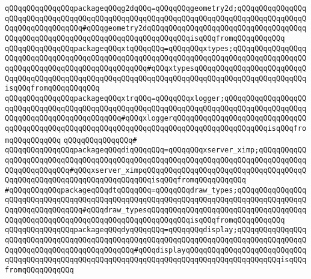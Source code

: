 \verb|qQQqqQQqqQQqqQQqpackageqQQqg2dqQQq=qQQqqQQqgeometry2d;qQQqqQQqqQQqqQQqqQQqqQQqqQQqqQQqqQQqqQQqqQQqqQQqqQQqqQQqqQQqqQQqqQQqqQQqqQQqqQQqqQQqqQQqqQQqqQQqqQQqqQQq#qQQqgeometry2dqQQqqQQqqQQqqQQqqQQqqQQqqQQqqQQqqQQqqQQqqQQqqQQqqQQqqQQqqQQqqQQqqQQqqQQqqQQqqQQqisqQQqfromqQQqqQQqqQQq|\newline
\verb|qQQqqQQqqQQqqQQqpackageqQQqxtqQQqqQQq=qQQqqQQqxtypes;qQQqqQQqqQQqqQQqqQQqqQQqqQQqqQQqqQQqqQQqqQQqqQQqqQQqqQQqqQQqqQQqqQQqqQQqqQQqqQQqqQQqqQQqqQQqqQQqqQQqqQQqqQQqqQQqqQQqqQQq#qQQqxtypesqQQqqQQqqQQqqQQqqQQqqQQqqQQqqQQqqQQqqQQqqQQqqQQqqQQqqQQqqQQqqQQqqQQqqQQqqQQqqQQqqQQqqQQqqQQqqQQqisqQQqfromqQQqqQQqqQQq|\newline
\verb|qQQqqQQqqQQqqQQqpackageqQQqxtrqQQq=qQQqqQQqxlogger;qQQqqQQqqQQqqQQqqQQqqQQqqQQqqQQqqQQqqQQqqQQqqQQqqQQqqQQqqQQqqQQqqQQqqQQqqQQqqQQqqQQqqQQqqQQqqQQqqQQqqQQqqQQqqQQqqQQq#qQQqxloggerqQQqqQQqqQQqqQQqqQQqqQQqqQQqqQQqqQQqqQQqqQQqqQQqqQQqqQQqqQQqqQQqqQQqqQQqqQQqqQQqqQQqqQQqqQQqisqQQqfromqQQqqQQqqQQq|\newline
\verb|qQQqqQQqqQQqqQQq#|\newline
\verb|qQQqqQQqqQQqqQQqpackageqQQqdiqQQqqQQq=qQQqqQQqxserver_ximp;qQQqqQQqqQQqqQQqqQQqqQQqqQQqqQQqqQQqqQQqqQQqqQQqqQQqqQQqqQQqqQQqqQQqqQQqqQQqqQQqqQQqqQQqqQQqqQQq#qQQqxserver_ximpqQQqqQQqqQQqqQQqqQQqqQQqqQQqqQQqqQQqqQQqqQQqqQQqqQQqqQQqqQQqqQQqqQQqqQQqisqQQqfromqQQqqQQqqQQq|\newline
\verb|#qQQqqQQqqQQqpackageqQQqdtqQQqqQQq=qQQqqQQqdraw_types;qQQqqQQqqQQqqQQqqQQqqQQqqQQqqQQqqQQqqQQqqQQqqQQqqQQqqQQqqQQqqQQqqQQqqQQqqQQqqQQqqQQqqQQqqQQqqQQqqQQqqQQq#qQQqdraw_typesqQQqqQQqqQQqqQQqqQQqqQQqqQQqqQQqqQQqqQQqqQQqqQQqqQQqqQQqqQQqqQQqqQQqqQQqqQQqqQQqisqQQqfromqQQqqQQqqQQq|\newline
\verb|qQQqqQQqqQQqqQQqpackageqQQqdyqQQqqQQq=qQQqqQQqdisplay;qQQqqQQqqQQqqQQqqQQqqQQqqQQqqQQqqQQqqQQqqQQqqQQqqQQqqQQqqQQqqQQqqQQqqQQqqQQqqQQqqQQqqQQqqQQqqQQqqQQqqQQqqQQqqQQqqQQq#qQQqdisplayqQQqqQQqqQQqqQQqqQQqqQQqqQQqqQQqqQQqqQQqqQQqqQQqqQQqqQQqqQQqqQQqqQQqqQQqqQQqqQQqqQQqqQQqqQQqisqQQqfromqQQqqQQqqQQq|\newline
